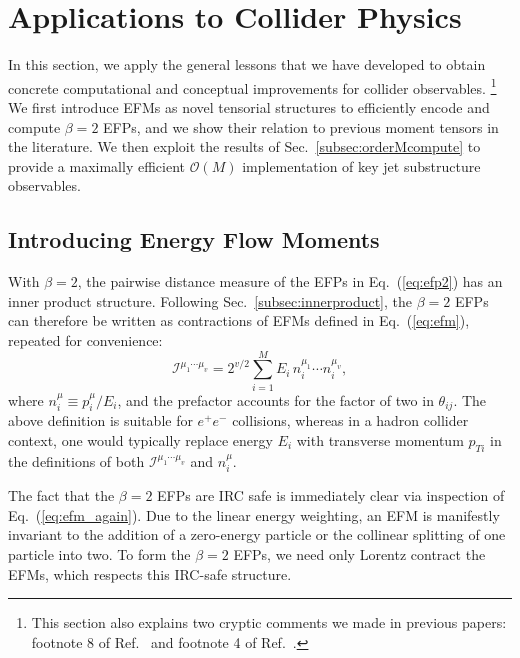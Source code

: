 \documentclass[aps,prd,floatfix,preprintnumbers,twocolumn,groupedaddress,nofootinbib,longbibliography,10pt]{revtex4-1}
\DeclareRobustCommand{\Sec}[1]{Sec.~\ref{#1}}
\DeclareRobustCommand{\Eq}[1]{Eq.~(\ref{#1})}
\DeclareRobustCommand{\Ref}[1]{Ref.~\cite{#1}}
\begin{document}
\section{Applications to Collider Physics}
\label{sec:energyflow}


In this section, we apply the general lessons that we have developed to obtain concrete computational and conceptual improvements for collider observables.%
%
\footnote{This section also explains two cryptic comments we made in previous papers: footnote 8 of \Ref{Komiske:2017aww} and footnote 4 of \Ref{Komiske:2018cqr}.}
%
We first introduce EFMs as novel tensorial structures to efficiently encode and compute $\beta = 2$ EFPs, and we show their relation to previous moment tensors in the literature.
%
We then exploit the results of \Sec{subsec:orderMcompute} to provide a maximally efficient $\mathcal O(M)$ implementation of key jet substructure observables.


\subsection{Introducing Energy Flow Moments}
\label{subsec:revisit_efps}


With $\beta=2$, the pairwise distance measure of the EFPs in \Eq{eq:efp2} has an inner product structure.
%
Following \Sec{subsec:innerproduct}, the $\beta=2$ EFPs can therefore be written as contractions of EFMs defined in \Eq{eq:efm}, repeated for convenience:
%
\begin{equation}
\label{eq:efm_again}
\mathcal I^{\mu_1 \cdots \mu_v} = 2^{v/2} \sum_{i=1}^M E_i \, n_i^{\mu_1} \cdots n_i^{\mu_v},
\end{equation}
%
where $n_i^\mu \equiv p_i^\mu/E_i$, and the prefactor accounts for the factor of two in $\theta_{ij}$.
%
The above definition is suitable for $e^+ e^-$ collisions, whereas in a hadron collider context, one would typically replace energy $E_i$ with transverse momentum $p_{Ti}$ in the definitions of both $\mathcal I^{\mu_1 \cdots \mu_v}$ and $n_i^\mu$.


The fact that the $\beta=2$ EFPs are IRC safe is immediately clear via inspection of \Eq{eq:efm_again}.
%
Due to the linear energy weighting, an EFM is manifestly invariant to the addition of a zero-energy particle or the collinear splitting of one particle into two.
%
To form the $\beta=2$ EFPs, we need only Lorentz contract the EFMs, which respects this IRC-safe structure.
\end{document}
